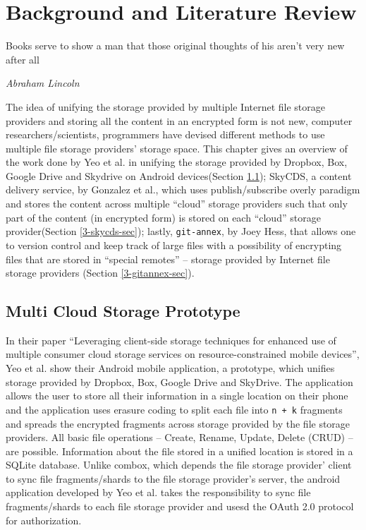 \chapter{Background and Literature Review}

\epigraph{Books serve to show a man that those original thoughts of
  his aren't very new after all}{\textit{Abraham Lincoln}}

The idea of unifying the storage provided by multiple Internet file
storage providers and storing all the content in an encrypted form is
not new, computer researchers/scientists, programmers have devised
different methods to use multiple file storage providers' storage
space. This chapter gives an overview of the work done by Yeo et
al. in unifying the storage provided by Dropbox, Box, Google Drive and
Skydrive on Android devices\cite{yeo}(Section \ref{3-yeo-sec});
SkyCDS, a content delivery service, by Gonzalez et al., which uses
publish/subscribe overly paradigm and stores the content across
multiple ``cloud'' storage providers such that only part of the
content (in encrypted form) is stored on each ``cloud'' storage
provider\cite{skycds}(Section \ref{3-skycds-sec}); lastly,
\verb+git-annex+, by Joey Hess\cite{person:joeyh}, that allows one to
version control and keep track of large files with a possibility of
encrypting files that are stored in ``special remotes'' -- storage
provided by Internet file storage providers (Section
\ref{3-gitannex-sec}).

\section{Multi Cloud Storage Prototype}\label{3-yeo-sec}

In their paper ``Leveraging client-side storage techniques for
enhanced use of multiple consumer cloud storage services on
resource-constrained mobile devices'', Yeo et al. show their Android
mobile application, a prototype, which unifies storage provided by
Dropbox, Box, Google Drive and SkyDrive. The application allows the
user to store all their information in a single location on their
phone and the application uses erasure coding\cite{weatherspoon} to
split each file into \verb`n + k` fragments and spreads the encrypted
fragments across storage provided by the file storage providers. All
basic file operations -- Create, Rename, Update, Delete (CRUD) -- are
possible. Information about the file stored in a unified location is
stored in a SQLite database. Unlike combox, which depends the file
storage provider' client to sync file fragments/shards to the file
storage provider's server, the android application developed by Yeo et
al. takes the responsibility to sync file fragments/shards to each
file storage provider and usesd the OAuth 2.0\cite{protocal:oauth2}
protocol for authorization.

